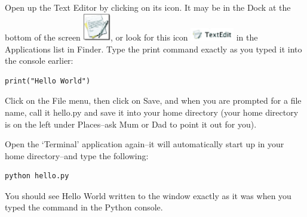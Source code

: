 \begin{MAC}
Open up the Text Editor by clicking on its icon.  It may be in the Dock at the bottom of the screen \includegraphics*[width=12mm]{eps/textedit-icon.eps}, or look for this icon \includegraphics*[width=19mm]{eps/textedit-icon2.eps} in the Applications list in Finder.  Type the print command exactly as you typed it into the console earlier:

\begin{listing}
\begin{verbatim}
print("Hello World")
\end{verbatim}
\end{listing}

Click on the File menu, then click on Save, and when you are prompted for a file name, call it hello.py and save it into your home directory (your home directory is on the left under Places--ask Mum or Dad to point it out for you).

Open the `Terminal' application again--it will automatically start up in your home directory--and type the following:

\begin{listing}
\begin{verbatim}
python hello.py
\end{verbatim}
\end{listing}

You should see Hello World written to the window exactly as it was when you typed the command in the Python console.

\end{MAC}

